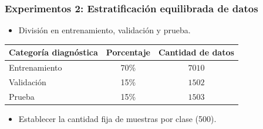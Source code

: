 \documentclass{beamer}
\begin{document}
\begin{frame}
  \frametitle{Experimentos  2: Estratificación equilibrada de datos}
  
  \begin{itemize}
    \item División en entrenamiento, validación y prueba.
  \end{itemize}

  \begin{table}[H]
    \centering
    \begin{tabular}{lcc}
    \hline
    \textbf{Categoría diagnóstica} & \textbf{Porcentaje} & \textbf{Cantidad de datos} \\
    \hline
    Entrenamiento  & 70\% &  $7010$ \\
    Validación     & 15\% & $1502$  \\
    Prueba         & 15\% & $1503$  \\ \hline
    \end{tabular}
    \label{table:data_distribution_e2}
    \end{table}

  \begin{itemize}
    \item <2-> Establecer la cantidad fija de muestras por clase (500).
  \end{itemize}

\end{frame}
\end{document}

